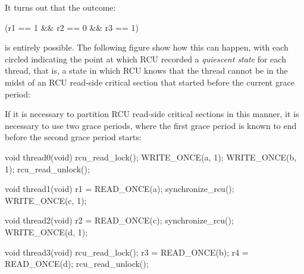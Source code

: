 It turns out that the outcome:

\begin{VerbatimU}
      (r1 == 1 && r2 == 0 && r3 == 1)
\end{VerbatimU}

\noindent%
is entirely possible.
The following figure show how this can happen,
with each circled  indicating the point at which RCU recorded a
\emph{quiescent state} for each thread, that is, a state in which RCU knows
that the thread cannot be in the midst of an RCU read-side critical
section that started before the current grace period:

\begin{center}
\end{center}

If it is necessary to partition RCU read-side critical sections in this
manner, it is necessary to use two grace periods, where the first grace
period is known to end before the second grace period starts:

\begin{VerbatimN}
	void thread0(void)
	{
		rcu_read_lock();
		WRITE_ONCE(a, 1);
		WRITE_ONCE(b, 1);
		rcu_read_unlock();
	}

	void thread1(void)
	{
		r1 = READ_ONCE(a);
		synchronize_rcu();
		WRITE_ONCE(c, 1);
	}

	void thread2(void)
	{
		r2 = READ_ONCE(c);
		synchronize_rcu();
		WRITE_ONCE(d, 1);
	}

	void thread3(void)
	{
		rcu_read_lock();
		r3 = READ_ONCE(b);
		r4 = READ_ONCE(d);
		rcu_read_unlock();
	}
\end{VerbatimN}

